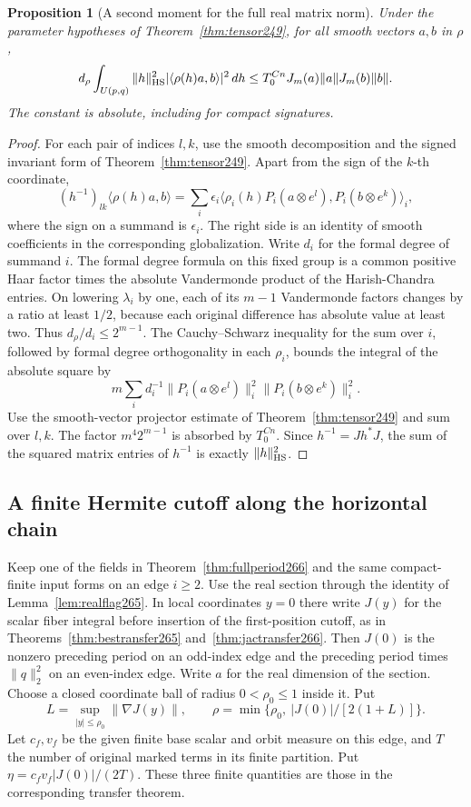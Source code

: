 \documentclass[a4paper,11pt]{article}
\newtheorem{proposition}{Proposition}[section]
\theoremstyle{definition}
\theoremstyle{remark}
\numberwithin{equation}{section}
\begin{document}
\begin{proposition}[A second moment for the full real matrix norm]
\label{prop:moment249}
Under the parameter hypotheses of Theorem~\ref{thm:tensor249}, for
all smooth vectors \(a,b\) in \(\rho\),
\[
 d_\rho\int_{U(p,q)}\|h\|_{\rm HS}^2
                 |\langle\rho(h)a,b\rangle|^2\,dh
       \le T_0^{C n} J_m(a)\|a\|J_m(b)\|b\| .
\]
The constant is absolute, including for compact signatures.
\end{proposition}
\begin{proof}
For each pair of indices \(l,k\), use the smooth decomposition and the
signed invariant form of Theorem~\ref{thm:tensor249}. Apart from the sign
of the \(k\)-th coordinate,
\[
  (h^{-1})_{lk}\langle\rho(h)a,b\rangle
   =\sum_i \epsilon_i
      \langle\rho_i(h) P_i(a\otimes e^l), P_i(b\otimes e^k)\rangle_i ,
\]
where the sign on a summand is \(\epsilon_i\). The right side is an
identity of smooth coefficients in the corresponding globalization.
Write \(d_i\) for the formal degree of summand \(i\). The formal
degree formula on this fixed group is a common positive Haar factor
times the absolute Vandermonde product of the Harish-Chandra entries.
On lowering \(\lambda_i\) by one, each of its \(m-1\) Vandermonde
factors changes by a ratio at least \(1/2\), because each original
difference has absolute value at least two. Thus \(d_\rho/d_i\le2^{m-1}\).
The Cauchy--Schwarz inequality for the sum over \(i\), followed by
formal degree orthogonality in each \(\rho_i\), bounds the integral
of the absolute square by
\[
        m\sum_i d_i^{-1}\|P_i(a\otimes e^l)\|_i^2
                            \|P_i(b\otimes e^k)\|_i^2 .
\]
Use the smooth-vector projector estimate of Theorem~\ref{thm:tensor249}
and sum over \(l,k\). The factor \(m^4 2^{m-1}\) is absorbed by
\(T_0^{C n}\). Since \(h^{-1}=Jh^*J\), the sum of the squared matrix
entries of \(h^{-1}\) is exactly \(\|h\|_{\rm HS}^2\).
\end{proof}

\subsection{A finite Hermite cutoff along the horizontal chain}\label{nav:IX-42}
Keep one of the fields in Theorem~\ref{thm:fullperiod266}
and the same compact-finite input forms on an edge \(i\ge2\).
Use the real section through the identity of
Lemma~\ref{lem:realflag265}. In local coordinates \(y=0\)
there write \(J(y)\) for the scalar fiber integral before
insertion of the first-position cutoff, as in
Theorems~\ref{thm:bestransfer265} and~\ref{thm:jactransfer266}.
Then \(J(0)\) is the nonzero preceding period on an odd-index
edge and the preceding period times \(\|q\|_2^2\) on an
even-index edge. Write \(a\) for the real dimension of the
section. Choose a closed coordinate ball of radius
\(0<\rho_0\le1\) inside it. Put
\[
 L=\sup_{|y|\le\rho_0}\|\nabla J(y)\|,\qquad
 \rho=\min\{\rho_0,\ |J(0)|/[2(1+L)]\}.
\]
Let \(c_f,v_f\) be the given finite base scalar and orbit
measure on this edge, and \(T\) the number of original marked
terms in its finite partition. Put
\(\eta=c_fv_f|J(0)|/(2T)\). These three finite quantities
are those in the corresponding transfer theorem.
\end{document}
